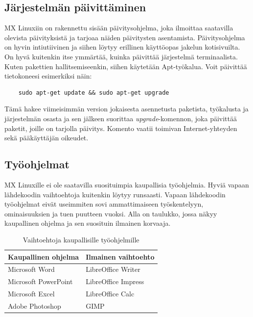 \documentclass[a4paper, 12pt, finnish]{article}
\begin{document}
\subsection{Järjestelmän päivittäminen}
MX Linuxiin on rakennettu sisään päivitysohjelma, joka ilmoittaa saatavilla olevista päivityksistä ja tarjoaa näiden päivitysten asentamista. Päivitysohjelma on hyvin intiutiivinen ja siihen löytyy erillinen käyttöopas jakelun kotisivuilta. On hyvä kuitenkin itse ymmärtää, kuinka päivittää järjestelmä terminaalista. Kuten pakettien hallitsemiseenkin, siihen käytetään Apt-työkalua. Voit päivittää tietokoneesi esimerkiksi näin:
\begin{lstlisting}
    sudo apt-get update && sudo apt-get upgrade
\end{lstlisting}
Tämä hakee viimeisimmän version jokaisesta asennetusta paketista, työkalusta ja järjestelmän osasta ja sen jälkeen suorittaa \textit{upgrade}-komennon, joka päivittää paketit, joille on tarjolla päivitys. Komento vaatii toimivan Internet-yhteyden sekä pääkäyttäjän oikeudet.

\subsection{Työohjelmat}

MX Linuxille ei ole saatavilla suosituimpia kaupallisia työohjelmia. Hyviä vapaan lähdekoodin vaihtoehtoja kuitenkin löytyy runsaasti. Vapaan lähdekoodin työohjelmat eivät useimmiten sovi ammattimaiseen työskentelyyn, ominaisuuksien ja tuen puutteen vuoksi.
Alla on taulukko, jossa näkyy kaupallinen ohjelma ja sen suosituin ilmainen korvaaja.

\begin{table}[ht]
\caption{Vaihtoehtoja kaupallisille työohjelmille}
\label{tab:oss}
    \begin{center}
\begin{tabular}{ll}
\textbf{Kaupallinen ohjelma}              & \textbf{Ilmainen vaihtoehto} \\ \hline
\multicolumn{1}{l|}{Microsoft Word}       & LibreOffice Writer           \\
\multicolumn{1}{l|}{Microsoft PowerPoint} & LibreOffice Impress          \\
\multicolumn{1}{l|}{Microsoft Excel}      & LibreOffice Calc             \\
\multicolumn{1}{l|}{Adobe Photoshop}      & GIMP
\end{tabular}
    \end{center}
\end{table}
\end{document}
